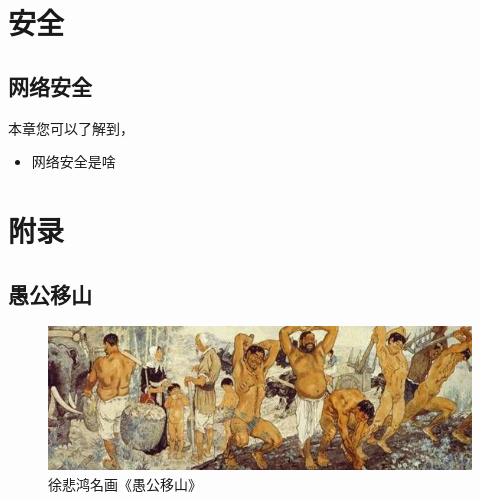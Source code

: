 \documentclass[doctor,openright,twoside]{sjtuthesis}
\makeatletter
\newif\ifusepartquote
\newcommand{\thepartquote}{}
\newcommand{\thepartquoteauthor}{}
\newcommand{\partquote}[2]{\ifusepartquote\renewcommand{\thepartquote}{#1}\renewcommand{\thepartquoteauthor}{#2}\fi}
\newif\ifusepartintro
\newcommand{\thepartintro}{}
\newcommand{\partintro}[1]{\ifusepartintro\renewcommand{\thepartintro}{#1}\fi}
\providecommand{\tightlist}{%
    \setlength{\itemsep}{0pt}\setlength{\parskip}{0pt}}
\theoremstyle{plain}
\theoremstyle{definition}
\theoremstyle{remark}
\theoremstyle{ocrenumbox}
\theoremstyle{plain}
\newcommand\writeby[1]{\rightline{------ #1}}
\newcommand*\Tiangan[1]{\csname tiangan\romannumeral\value{#1}\endcsname}
\let\oldappendix\appendix
\renewcommand\appendix{%
  \oldappendix
  \renewcommand{\CTEX@prechapter}{附录}
  \renewcommand{\CTEX@thechapter}{\Tiangan{chapter}}
  \renewcommand{\thechapter}{\Tiangan{chapter}}
}
\makeatother
\begin{document}
\partquote{三军之事，莫亲于间，赏莫厚于间，事莫密于间。非圣智不能用间，非仁义不能使间，非微妙不能得间之实。微哉！微哉！无所不用间也。}{孙武《孙子兵法 用间》}
\partintro{
古人云“千里之堤，溃于蚁穴”。害人之心不可有，防人之心不可无。作为系统使用者和管理者，必须牢牢绷紧安全这根弦。本部分简要的介绍一些安全常识，也只是避免一些小的安全隐患。更多知识，还需查阅更专业的安全书籍和资料。
}

\hypertarget{part:security}{%
\part{安全}\label{part:security}}

\hypertarget{chap:network-security}{%
\chapter{网络安全}\label{chap:network-security}}

本章您可以了解到，

\begin{itemize}
\tightlist
\item
  网络安全是啥
\end{itemize}

\partquote{这只是万里长征走完了第一步，以后的路程更长，工作更伟大，更艰苦。务必使同志们继续地保持谦虚、谨慎、不骄不躁的作风，务必使同志们继续地保持艰苦奋斗的作风。}{毛泽东}
\partintro{
\quad\quad 附录，首先引用了中国的一篇古文《愚公移山》，目的是告诉自己要坚持坚持再坚持；其次讲述了本书的制作步骤，方便后来人对模板进行改编和再创作；再次介绍了本书的大致框架设计，提醒需要注意的问题；再次列举了写作中常见的 \LaTeX 和 Bookdown 编写的示例；最后是常见问题解答以及本书的大事记。
}

\hypertarget{part:others}{%
\part{附录}\label{part:others}}

\hypertarget{chap:appendix}{%
\appendix}


\hypertarget{chap:yugong}{%
\chapter{\texorpdfstring{愚公移山}{愚公移山}}\label{chap:yugong}}

\writeby{先秦 \quad 列御寇}

\begin{figure}
\centering
\includegraphics{images/yugongyishan.jpg}
\caption{徐悲鸿名画《愚公移山》}
\end{figure}
\end{document}
